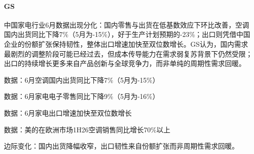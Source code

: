 \documentclass[11pt]{ctexart}
\begin{document}
\paragraph{GS} 中国家电行业6月数据出现分化：国内零售与出货在低基数效应下环比改善，空调国内出货同比下降7\%（5月为-15\%），好于生产计划预期的-23\%；出口则凭借中国企业的份额扩张保持韧性，整体出口增速加快至双位数增长。GS认为，国内需求最剧烈的调整阶段可能已经过去，但成本传导能力在需求弱复苏背景下仍然受限；出口的持续增长更多来自产品创新与全球竞争力，而非单纯的周期性需求回暖。
{\small\color{refgray}数据：6月空调国内出货同比下降7\%（5月为-15\%）\par}
{\small\color{refgray}数据：6月家电电子零售同比下降9\%（5月为-16\%）\par}
{\small\color{refgray}数据：6月家电出口增速加快至双位数增长\par}
{\small\color{refgray}数据：美的在欧洲市场1H26空调销售同比增长70\%以上\par}
{\small\color{refgray}边际变化：国内出货降幅收窄，出口韧性来自份额扩张而非周期性需求回暖。\par}
\end{document}
